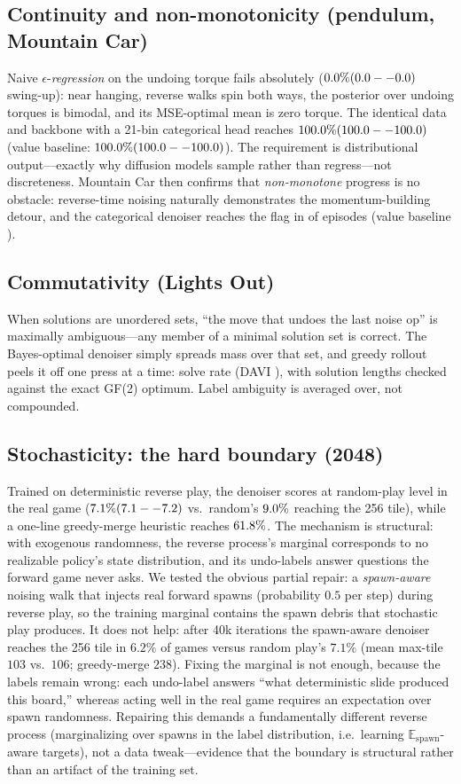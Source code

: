 \documentclass[11pt]{article}
\begin{document}
\subsection{Continuity and non-monotonicity (pendulum, Mountain Car)}
Naive $\epsilon$-\emph{regression} on the undoing torque fails absolutely
($0.0\% (0.0--0.0)$ swing-up): near hanging, reverse walks spin both ways, the
posterior over undoing torques is bimodal, and its MSE-optimal mean is zero
torque. The identical data and backbone with a 21-bin categorical head
reaches $100.0\% (100.0--100.0)$ (value baseline: $100.0\% (100.0--100.0)$). The requirement is
distributional output---exactly why diffusion models sample rather than
regress---not discreteness. Mountain Car then confirms that
\emph{non-monotone} progress is no obstacle: reverse-time noising naturally
demonstrates the momentum-building detour, and the categorical denoiser
reaches the flag in \mcDN{} of episodes (value baseline \mcVAL{}).

\subsection{Commutativity (Lights Out)}
When solutions are unordered sets, ``the move that undoes the last noise
op'' is maximally ambiguous---any member of a minimal solution set is
correct. The Bayes-optimal denoiser simply spreads mass over that set, and
greedy rollout peels it off one press at a time: \loDN{} solve rate (DAVI
\loDV{}), with solution lengths checked against the exact GF(2) optimum.
Label ambiguity is averaged over, not compounded.

\subsection{Stochasticity: the hard boundary (2048)}
Trained on deterministic reverse play, the denoiser scores at random-play
level in the real game ($7.1\% (7.1--7.2)$ vs.\ random's $9.0\%$ reaching the 256
tile), while a one-line greedy-merge heuristic reaches $61.8\%$. The
mechanism is structural: with exogenous randomness, the reverse process's
marginal corresponds to no realizable policy's state distribution, and its
undo-labels answer questions the forward game never asks. We tested the
obvious partial repair: a \emph{spawn-aware} noising walk that injects real
forward spawns (probability $0.5$ per step) during reverse play, so the
training marginal contains the spawn debris that stochastic play produces.
It does not help: after 40k iterations the spawn-aware denoiser reaches the
256 tile in $6.2\%$ of games versus random play's $7.1\%$ (mean max-tile
$103$ vs.\ $106$; greedy-merge $238$). Fixing the marginal is not enough,
because the labels remain wrong: each undo-label answers ``what deterministic
slide produced this board,'' whereas acting well in the real game requires
an expectation over spawn randomness. Repairing this demands a
fundamentally different reverse process (marginalizing over spawns in the
label distribution, i.e.\ learning $\mathbb{E}_{\text{spawn}}$-aware
targets), not a data tweak---evidence that the boundary is structural rather
than an artifact of the training set.
\end{document}
